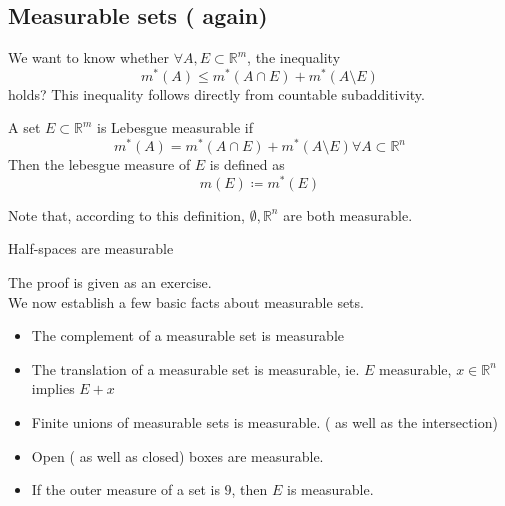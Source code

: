 \documentclass[../main.tex]{subfiles}
\begin{document}
\subsection{Measurable sets ( again) }
We want to know whether $\forall A,E \subset \mathbb{R}^m$, the inequality
\[ 
m^{*}( A) \leq m^{*}( A\cap E) + m^{*}( A \setminus E) 
\]
holds?
This inequality follows directly from countable subadditivity.
\begin{defn}
A set $E \subset \mathbb{R}^m$ is Lebesgue measurable if 
\[ 
m^{*}( A) = m^{*}( A\cap E) + m^{*}( A\setminus E) \forall A \subset \mathbb{R}^n
\]
Then the lebesgue measure of $E$ is defined as
\[ 
m( E) \coloneqq m^{*}( E) 
\]

\end{defn}
Note that, according to this definition, $\emptyset, \mathbb{R}^n$ are both measurable.
\begin{lemma}
Half-spaces are measurable
\end{lemma}
The proof is given as an exercise.\\
We now establish a few basic facts about measurable sets.
\begin{lemma}
\begin{itemize}
\item The complement of a measurable set is measurable
\item The translation of a measurable set is measurable, ie. $E$ measurable, $x\in \mathbb{R}^n$ implies $E+x$ 
\item Finite unions of measurable sets is measurable. ( as well as the intersection) 
\item Open ( as well as closed)  boxes are measurable.
\item If the outer measure of a set is $9$, then $E$ is measurable.	
\end{itemize}
\end{lemma}
\end{document}
